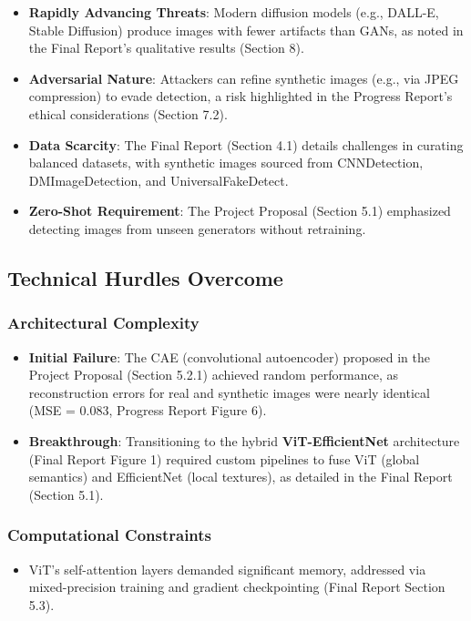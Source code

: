 \documentclass{article} %
\begin{document}
\begin{itemize}
    \item \textbf{Rapidly Advancing Threats}: Modern diffusion models (e.g., DALL-E, Stable Diffusion) produce images with fewer artifacts than GANs, as noted in the Final Report’s qualitative results (Section 8).
    \item \textbf{Adversarial Nature}: Attackers can refine synthetic images (e.g., via JPEG compression) to evade detection, a risk highlighted in the Progress Report’s ethical considerations (Section 7.2).
    \item \textbf{Data Scarcity}: The Final Report (Section 4.1) details challenges in curating balanced datasets, with synthetic images sourced from CNNDetection, DMImageDetection, and UniversalFakeDetect.
    \item \textbf{Zero-Shot Requirement}: The Project Proposal (Section 5.1) emphasized detecting images from unseen generators without retraining.
\end{itemize}

\subsection{Technical Hurdles Overcome}
\subsubsection{Architectural Complexity}
\begin{itemize}
    \item \textbf{Initial Failure}: The CAE (convolutional autoencoder) proposed in the Project Proposal (Section 5.2.1) achieved random performance, as reconstruction errors for real and synthetic images were nearly identical (MSE = 0.083, Progress Report Figure 6).
    \item \textbf{Breakthrough}: Transitioning to the hybrid \textbf{ViT-EfficientNet} architecture (Final Report Figure 1) required custom pipelines to fuse ViT (global semantics) and EfficientNet (local textures), as detailed in the Final Report (Section 5.1).
\end{itemize}

\subsubsection{Computational Constraints}
\begin{itemize}
    \item ViT’s self-attention layers demanded significant memory, addressed via mixed-precision training and gradient checkpointing (Final Report Section 5.3).
\end{itemize}
\end{document}
